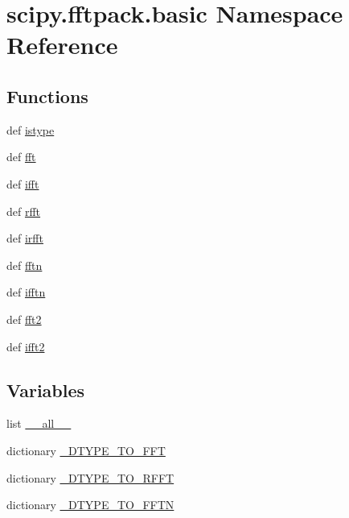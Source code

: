 \hypertarget{namespacescipy_1_1fftpack_1_1basic}{}\section{scipy.\+fftpack.\+basic Namespace Reference}
\label{namespacescipy_1_1fftpack_1_1basic}
\subsection*{Functions}
\begin{DoxyCompactItemize}
\item 
def \hyperlink{namespacescipy_1_1fftpack_1_1basic_a1e237440ce40ffe04b3ffc38d0374a88}{istype}
\item 
def \hyperlink{namespacescipy_1_1fftpack_1_1basic_a0704a50682c6c9f52c152065f12b31fa}{fft}
\item 
def \hyperlink{namespacescipy_1_1fftpack_1_1basic_a93a2c3f77a381cd9b05f4c1509c5442f}{ifft}
\item 
def \hyperlink{namespacescipy_1_1fftpack_1_1basic_a27f5005c13c9fc999df38bebf5ec2984}{rfft}
\item 
def \hyperlink{namespacescipy_1_1fftpack_1_1basic_ae29dc38c90167dd7babe19dc3477037c}{irfft}
\item 
def \hyperlink{namespacescipy_1_1fftpack_1_1basic_a394990bf7329cb63cdd153b8f981dbee}{fftn}
\item 
def \hyperlink{namespacescipy_1_1fftpack_1_1basic_a70746499c6f8faa3ee1f54ea19a936b2}{ifftn}
\item 
def \hyperlink{namespacescipy_1_1fftpack_1_1basic_a32222d4394999076d2af80514b0c7579}{fft2}
\item 
def \hyperlink{namespacescipy_1_1fftpack_1_1basic_a678527f52a57a95915b62d0b6ccae272}{ifft2}
\end{DoxyCompactItemize}
\subsection*{Variables}
\begin{DoxyCompactItemize}
\item 
list \hyperlink{namespacescipy_1_1fftpack_1_1basic_ac5fa46b8b54ce6d6dcae3ec8f993ce80}{\+\_\+\+\_\+all\+\_\+\+\_\+}
\item 
dictionary \hyperlink{namespacescipy_1_1fftpack_1_1basic_a5db7b7feacab3f4adef70fda5f2b329d}{\+\_\+\+D\+T\+Y\+P\+E\+\_\+\+T\+O\+\_\+\+F\+F\+T}
\item 
dictionary \hyperlink{namespacescipy_1_1fftpack_1_1basic_a9c405479e51eb69603548966d7985cb6}{\+\_\+\+D\+T\+Y\+P\+E\+\_\+\+T\+O\+\_\+\+R\+F\+F\+T}
\item 
dictionary \hyperlink{namespacescipy_1_1fftpack_1_1basic_a22c987ab3659bd6992f8c4211cd9a56d}{\+\_\+\+D\+T\+Y\+P\+E\+\_\+\+T\+O\+\_\+\+F\+F\+T\+N}
\end{DoxyCompactItemize}


